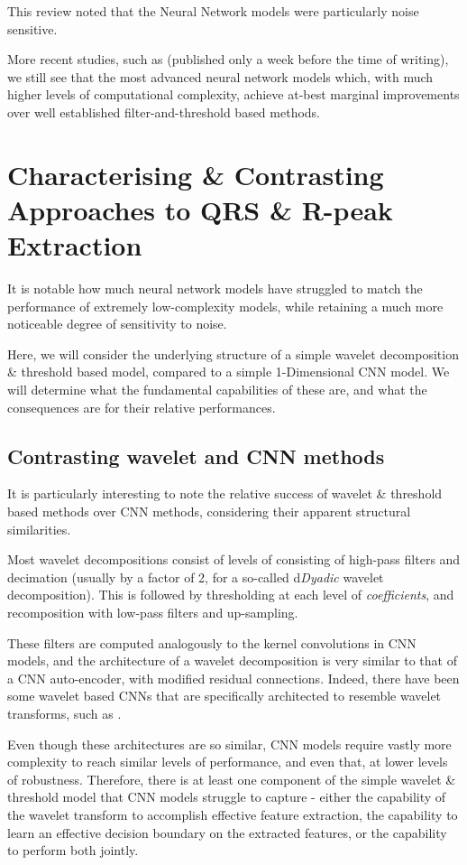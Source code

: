 \documentclass[9pt,conference]{IEEEtran}
\begin{document}
This review noted that the Neural Network models were particularly noise sensitive.

More recent studies, such as \cite{dogan_dogan_2023} (published only a week before the time of writing), we still see that the most advanced neural network models which, with much higher levels of computational complexity, achieve at-best marginal improvements over well established filter-and-threshold based methods.

\section{Characterising \& Contrasting Approaches to QRS \& R-peak Extraction}
It is notable how much neural network models have struggled to match the performance of extremely low-complexity models, while retaining a much more noticeable degree of sensitivity to noise.

Here, we will consider the underlying structure of a simple wavelet decomposition \& threshold based model, compared to a simple 1-Dimensional CNN model. We will determine what the fundamental capabilities of these are, and what the consequences are for their relative  performances.  

\subsection{Contrasting wavelet and CNN methods}
It is particularly interesting to note the relative success of wavelet \& threshold based methods over CNN methods, considering their apparent structural similarities.

Most wavelet decompositions consist of levels of consisting of high-pass filters and decimation (usually by a factor of 2, for a so-called d\textit{Dyadic} wavelet decomposition). This is followed by thresholding at each level of \textit{coefficients}, and recomposition with low-pass filters and up-sampling.

These filters are computed analogously to the kernel convolutions in CNN models, and the architecture of a wavelet decomposition is very similar to that of a CNN auto-encoder, with modified residual connections. Indeed, there have been some wavelet based CNNs that are specifically architected to resemble wavelet transforms, such as \cite{despawn}.

Even though these architectures are so similar, CNN models require vastly more complexity to reach similar levels of performance, and even that, at lower levels of robustness. Therefore, there is at least one component of the simple wavelet \& threshold model that CNN models struggle to capture - either the capability of the wavelet transform to accomplish effective feature extraction, the capability to learn an effective decision boundary on the extracted features, or the capability to perform both jointly.
\end{document}
